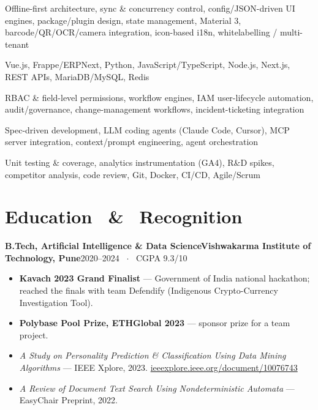 \documentclass[a4paper,10pt]{article}
\begin{document}
\begin{description}[leftmargin=0pt, style=unboxed, itemsep=1.5pt, font=\color{accent}\bfseries\small]
  \item[Mobile $\cdot$ Flutter/Dart] {\small Offline-first architecture, sync \& concurrency control, config/JSON-driven UI engines, package/plugin design, state management, Material 3, barcode/QR/OCR/camera integration, icon-based i18n, whitelabelling / multi-tenant}
  \item[Web $\cdot$ Full-Stack] {\small Vue.js, Frappe/ERPNext, Python, JavaScript/TypeScript, Node.js, Next.js, REST APIs, MariaDB/MySQL, Redis}
  \item[Platform $\cdot$ Security] {\small RBAC \& field-level permissions, workflow engines, IAM user-lifecycle automation, audit/governance, change-management workflows, incident-ticketing integration}
  \item[AI-Native Engineering] {\small Spec-driven development, LLM coding agents (Claude Code, Cursor), MCP server integration, context/prompt engineering, agent orchestration}
  \item[Practices] {\small Unit testing \& coverage, analytics instrumentation (GA4), R\&D spikes, competitor analysis, code review, Git, Docker, CI/CD, Agile/Scrum}
\end{description}

\section*{Education \, \& \, Recognition}

{\bfseries B.Tech, Artificial Intelligence \& Data Science}\;\textcolor{accent2}{\bfseries Vishwakarma Institute of Technology, Pune}\hfill{\small\color{muted}2020--2024 \, $\cdot$ \, CGPA 9.3/10}
\begin{itemize}
  \item \textbf{Kavach 2023 Grand Finalist} --- Government of India national hackathon; reached the finals with team Defendify (Indigenous Crypto-Currency Investigation Tool).
  \item \textbf{Polybase Pool Prize, ETHGlobal 2023} --- sponsor prize for a team project.
  \item \textit{A Study on Personality Prediction \& Classification Using Data Mining Algorithms} --- IEEE Xplore, 2023. \href{https://ieeexplore.ieee.org/document/10076743}{ieeexplore.ieee.org/document/10076743}
  \item \textit{A Review of Document Text Search Using Nondeterministic Automata} --- EasyChair Preprint, 2022.
\end{itemize}
\end{document}
